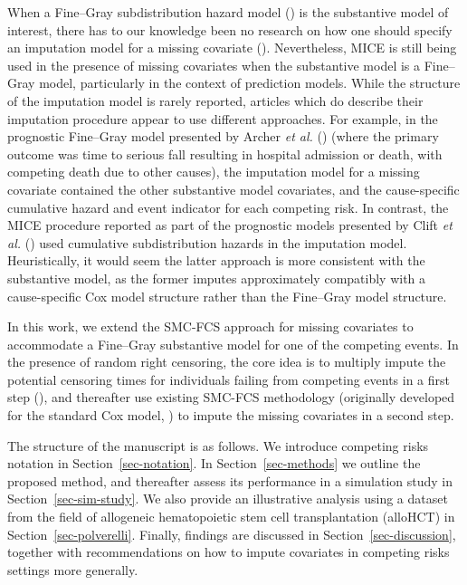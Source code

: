 \documentclass[
  letterpaper,
  paper=240mm:170mm,
  twoside=true,
  open=right,
  fontsize=10pt,
  pagesize=false,
  BCOR=15mm,
  DIV=14,
  headinclude=true,
  footinclude=false,
  headsepline=on]{scrbook}
\begin{document}
When a Fine--Gray subdistribution hazard model
()
is the substantive model of interest, there has to our knowledge been no
research on how one should specify an imputation model for a missing
covariate (). Nevertheless, MICE is still being used in the presence of
missing covariates when the substantive model is a Fine--Gray model,
particularly in the context of prediction models. While the structure of
the imputation model is rarely reported, articles which do describe
their imputation procedure appear to use different approaches. For
example, in the prognostic Fine--Gray model presented by Archer \emph{et
al.} ()
(where the primary outcome was time to serious fall resulting in
hospital admission or death, with competing death due to other causes),
the imputation model for a missing covariate contained the other
substantive model covariates, and the cause-specific cumulative hazard
and event indicator for each competing risk. In contrast, the MICE
procedure reported as part of the prognostic models presented by Clift
\emph{et al.} () used
cumulative subdistribution hazards in the imputation model.
Heuristically, it would seem the latter approach is more consistent with
the substantive model, as the former imputes approximately compatibly
with a cause-specific Cox model structure rather than the Fine--Gray
model structure.

In this work, we extend the SMC-FCS approach for missing covariates to
accommodate a Fine--Gray substantive model for one of the competing
events. In the presence of random right censoring, the core idea is to
multiply impute the potential censoring times for individuals failing
from competing events in a first step
(), and thereafter use existing SMC-FCS methodology (originally
developed for the standard Cox model,
) to impute the missing covariates in a second step.

The structure of the manuscript is as follows. We introduce competing
risks notation in Section~\ref{sec-notation}. In
Section~\ref{sec-methods} we outline the proposed method, and thereafter
assess its performance in a simulation study in
Section~\ref{sec-sim-study}. We also provide an illustrative analysis
using a dataset from the field of allogeneic hematopoietic stem cell
transplantation (alloHCT) in Section~\ref{sec-polverelli}. Finally,
findings are discussed in Section~\ref{sec-discussion}, together with
recommendations on how to impute covariates in competing risks settings
more generally.
\end{document}
